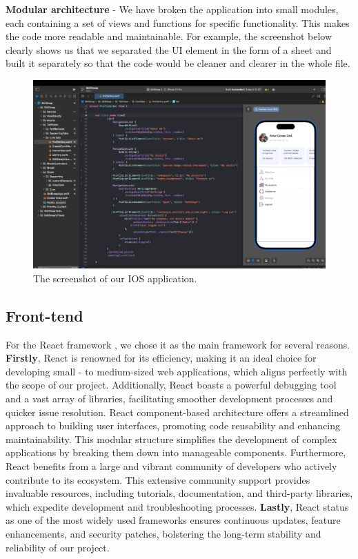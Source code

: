 \textbf{Modular architecture} - We have broken the application into small modules, each containing a set of views and functions for specific functionality. This makes the code more readable and maintainable.
For example, the screenshot below clearly shows us that we separated the UI element in the form of a sheet and built it separately so that the code would be cleaner and clearer in the whole file.

\begin{figure}[ht]\label{fig:screenios}
  \centering
  \includegraphics[width=0.8\linewidth]{figures/Screen IOS.png}
  \caption{The screenshot of our IOS application.}
\end{figure}

\subsection{Front-tend}\label{front}

\hspace*{1cm} For the React framework \cite{react}, we chose it as the main  \cite{htmlcssjs} framework for several reasons. \textbf{Firstly}, React \cite{react} is renowned for its efficiency, making it an ideal choice for developing small - to medium-sized web applications, which aligns perfectly with the scope of our project. Additionally, React \cite{react} boasts a powerful debugging tool and a vast array of libraries, facilitating smoother development processes and quicker issue resolution.
React \cite{react} component-based architecture offers a streamlined approach to building user interfaces, promoting code reusability and enhancing maintainability. This modular structure simplifies the development of complex applications by breaking them down into manageable components.
Furthermore, React \cite{react} benefits from a large and vibrant community of developers who actively contribute to its ecosystem. This extensive community support provides invaluable resources, including tutorials, documentation, and third-party libraries, which expedite development and troubleshooting processes. \textbf{Lastly}, React \cite{react} status as one of the most widely used  frameworks ensures continuous updates, feature enhancements, and security patches, bolstering the long-term stability and reliability of our project.

